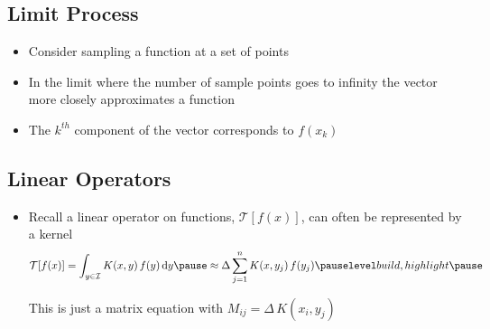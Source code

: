 \begin{slide}
\section[-2]{Limit Process}

\pb\pause
\begin{itemize}
\item Consider sampling a function at a set of
  points\pauseh{}
  \begin{center}
    \pause
  \end{center}
\item In the limit where the number of sample points goes to infinity
  the vector more closely approximates a function\pauseh
\item The $k^{th}$ component of the vector corresponds to $f(x_k)$\pauseh
\end{itemize}

\end{slide}

\begin{slide}
\section[-2]{Linear Operators}

\begin{PauseHighLight}
  \begin{itemize}\squeeze
  \item Recall a linear operator on functions, $\mathcal{T}[f(x)]$,
    can often be represented by a kernel
    \begin{align*}
      \mathcal{T}[f(x)] = \int_{y\in\mathcal{I}} K(x,y)\,f(y)\,\dd
      y\pause \approx \Delta \sum_{j=1}^n K(x, y_j)\, f(y_j)\pauseb
    \end{align*}
    \begin{center}
      \pauseb
    \end{center}
  This is just a matrix equation with $M_{ij}=\Delta\,K(x_i, y_j)$\pause
  \end{itemize}
\end{PauseHighLight}

\end{slide}

